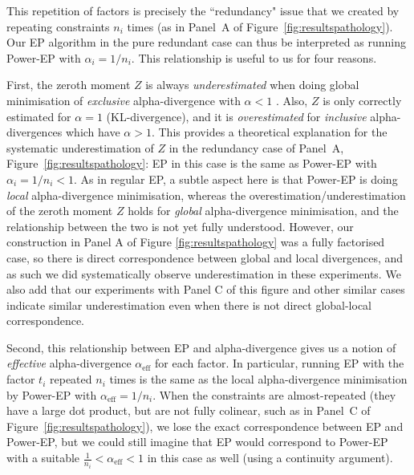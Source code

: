 \documentclass[twoside,11pt]{article}
\begin{document}
This repetition of factors is precisely the ``redundancy" issue that we created by repeating constraints $n_i$ times (as in Panel~A of Figure~\ref{fig:resultspathology}). Our EP algorithm in the pure redundant case can thus be interpreted as running Power-EP with $\alpha_i = 1/n_i$.  This relationship is useful to us for four reasons. 

First, the zeroth moment $Z$ is always \emph{underestimated} when doing global minimisation of \emph{exclusive} alpha-divergence with $\alpha<1$ \cite[]{minkaMSFTTR2005}.  Also, $Z$ is only correctly estimated for $\alpha=1$ (KL-divergence), and it is \emph{overestimated} for \emph{inclusive} alpha-divergences which have $\alpha>1$.   This provides a theoretical explanation for the systematic underestimation of $Z$ in the redundancy case of Panel~A, Figure~\ref{fig:resultspathology}:  EP in this case is the same as Power-EP with $\alpha_i = 1/n_i < 1$.  As in regular EP, a subtle aspect here is that Power-EP is doing \emph{local} alpha-divergence minimisation, whereas the overestimation/underestimation of the zeroth moment $Z$ holds for \emph{global} alpha-divergence minimisation, and the relationship between the two is not yet fully understood.   However, our construction in Panel A of Figure \ref{fig:resultspathology} was a fully factorised case, so there is direct correspondence between global and local divergences, and as such we did systematically observe underestimation in these experiments.  We also add that our experiments with Panel C of this figure and other similar cases indicate similar underestimation even when there is not direct global-local correspondence. 

Second, this relationship between EP and alpha-divergence gives us a notion of \emph{effective} alpha-divergence $\alpha_\text{eff}$ for each factor. In particular, running EP with the factor $t_i$ repeated $n_i$ times is the same as the local alpha-divergence minimisation by Power-EP with $\alpha_\text{eff} = 1/n_i$. When the constraints are almost-repeated (they have a large dot product, but are not fully colinear, such as in Panel~C of Figure~\ref{fig:resultspathology}), we lose the exact correspondence between EP and Power-EP, but we could still imagine that EP would correspond to Power-EP with a suitable $\frac{1}{n_i} < \alpha_\text{eff}<1$ in this case as well (using a continuity argument). 
\end{document}
